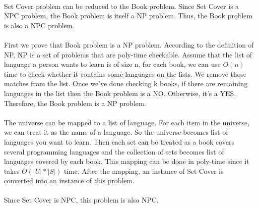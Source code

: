 \begin{problem}{4} ~\\
Set Cover problem can be reduced to the Book problem. Since Set Cover is a NPC problem, the Book problem is itself a NP problem. Thus, the Book problem is also a NPC problem.\\
\\
First we prove that Book problem is a NP problem. According to the definition of NP, NP is a set of problems that are poly-time checkable. Assume that the list of language a person wants to learn is of size n, for each book, we can use $O(n)$ time to check whether it contains some languages on the lists. We remove those matches from the list. Once we've done checking k books, if there are remaining languages in the list then the Book problem is a NO. Otherwise, it's a YES. Therefore, the Book problem is a NP problem.\\
\\
The universe can be mapped to a list of language. For each item in the universe, we can treat it as the name of a language. So the universe becomes list of languages you want to learn. Then each set can be treated as a book covers several programming languages and the collection of sets becomes list of languages covered by each book. This mapping can be done in poly-time since it takes $O(|U|*|S|)$ time. After the mapping, an instance of Set Cover is converted into an instance of this problem. \\
\\
Since Set Cover is NPC, this problem is also NPC.
\end{problem}